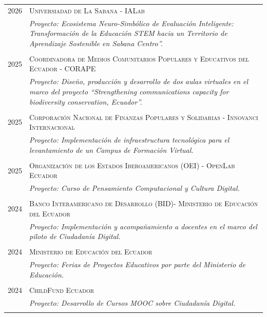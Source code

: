 \documentclass[a4paper]{article}
\begin{document}
\begin{longtable}{r|p{12cm}}
\textsc{2026} &  \textsc{Universiadad de La Sabana - IALab} \\&\emph{Proyecto: Ecosistema Neuro-Simbólico de Evaluación Inteligente: Transformación de la Educación
STEM hacia un Territorio de Aprendizaje Sostenible en Sabana Centro”.}\\\multicolumn{2}{c}{}\\


\textsc{2025} &  \textsc{Coordinadora de Medios Comunitarios Populares y Educativos del Ecuador - CORAPE} \\&\emph{Proyecto: Diseño, producción y desarrollo de dos aulas virtuales en el marco del proyecto “Strengthening communications capacity for biodiversity conservation, Ecuador”.}\\\multicolumn{2}{c}{}\\

\textsc{2025} &  \textsc{Corporación Nacional de Finanzas Populares y Solidarias - Innovanci Internacional} \\&\emph{Proyecto: Implementación de infraestructura tecnológica para el levantamiento de un Campus de Formación Virtual.}\\\multicolumn{2}{c}{}\\

\textsc{2025} &  \textsc{Organización de los Estados Iberoamericanos (OEI) - OpenLab Ecuador} \\&\emph{Proyecto: Curso de Pensamiento Computacional y Cultura Digital.}\\\multicolumn{2}{c}{}\\

\textsc{2024} &  \textsc{Banco Interamericano de Desarrollo (BID)- Ministerio de Educación del Ecuador} \\&\emph{Proyecto: Implementación y acompañamiento a docentes
en el marco del piloto de Ciudadanía Digital.}\\\multicolumn{2}{c}{}\\


\textsc{2024} &  \textsc{Ministerio de Educación del Ecuador} \\&\emph{Proyecto: Ferias de Proyectos Educativos por parte del Ministerio de Educación.}\\\multicolumn{2}{c}{}\\

\textsc{2024} &  \textsc{ChildFund Ecuador} \\&\emph{Proyecto: Desarrollo de Cursos MOOC sobre Ciudadanía Digital.}\\\multicolumn{2}{c}{}\\


\end{longtable}
\end{document}
